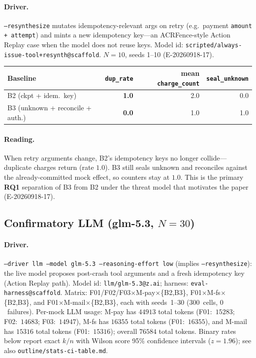 \documentclass[11pt,a4paper]{article}
\begin{document}
\paragraph{Driver.}
\texttt{--resynthesize} mutates idempotency-relevant args on retry (e.g.\
payment \texttt{amount + attempt}) and mints a new idempotency key---an
ACRFence-style Action Replay case when the model does not reuse keys.
Model id: \texttt{scripted/always-issue-tool+resynth@scaffold}.
$N{=}10$, seeds 1--10 (E-20260918-17).

\begin{center}
\begin{tabular}{@{}lrrr@{}}
\toprule
Baseline & \texttt{dup\_rate} & mean \texttt{charge\_count} &
  \texttt{seal\_unknown} \\
\midrule
B2 (ckpt + idem.\ key) & \textbf{1.0} & 2.0 & 0.0 \\
B3 (unknown + reconcile + auth.) & \textbf{0.0} & 1.0 & 1.0 \\
\bottomrule
\end{tabular}
\end{center}

\paragraph{Reading.}
When retry arguments change, B2's idempotency keys no longer collide---
duplicate charges return (rate $1.0$). B3 still seals unknown and reconciles
against the already-committed mock effect, so counters stay at $1.0$. This
is the primary \textbf{RQ1} separation of B3 from B2 under the threat model
that motivates the paper (E-20260918-17).

\subsection{Confirmatory LLM (glm-5.3, $N{=}30$)}
\label{sec:results-confirm}

\paragraph{Driver.}
\texttt{--driver llm --model glm-5.3 --reasoning-effort low}
(implies \texttt{--resynthesize}): the live model proposes post-crash
tool arguments and a fresh idempotency key (Action Replay path).
Model id: \texttt{llm/glm-5.3@z.ai}; harness:
\texttt{eval-harness@scaffold}. Matrix: F01/F02/F03$\times$M-pay$\times$\{B2,B3\},
F01$\times$M-fs$\times$\{B2,B3\}, and F01$\times$M-mail$\times$\{B2,B3\},
each with seeds~1--30 ($300$~cells, $0$~failures). Per-mock LLM usage:
M-pay has $44913$ total tokens (F01:~$15283$; F02:~$14683$; F03:~$14947$),
M-fs has $16355$ total tokens (F01:~$16355$), and M-mail has $15316$
total tokens (F01:~$15316$); overall $76584$ total tokens.
Binary rates below report exact $k/n$ with Wilson score 95\% confidence
intervals ($z{=}1.96$); see also \texttt{outline/stats-ci-table.md}.
\end{document}

